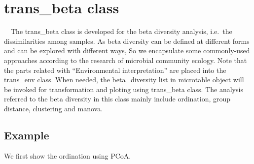 \documentclass[
]{book}
\newenvironment{Shaded}{\begin{snugshade}}{\end{snugshade}}
\newcommand{\AttributeTok}[1]{\textcolor[rgb]{0.77,0.63,0.00}{#1}}
\newcommand{\CommentTok}[1]{\textcolor[rgb]{0.56,0.35,0.01}{\textit{#1}}}
\newcommand{\ConstantTok}[1]{\textcolor[rgb]{0.00,0.00,0.00}{#1}}
\newcommand{\FunctionTok}[1]{\textcolor[rgb]{0.00,0.00,0.00}{#1}}
\newcommand{\NormalTok}[1]{#1}
\newcommand{\OtherTok}[1]{\textcolor[rgb]{0.56,0.35,0.01}{#1}}
\newcommand{\SpecialCharTok}[1]{\textcolor[rgb]{0.00,0.00,0.00}{#1}}
\newcommand{\StringTok}[1]{\textcolor[rgb]{0.31,0.60,0.02}{#1}}
\begin{document}
\hypertarget{trans_beta-class}{%
\section{trans\_beta class}\label{trans_beta-class}}

　The trans\_beta class is developed for the beta diversity analysis, i.e.~the dissimilarities among samples.
As beta diversity can be defined at different forms\citep{Tuomisto_diversity_2010} and can be explored with different ways\citep{Anderson_Navigating_2011},
So we encapsulate some commonly-used approaches according to the research of microbial community ecology\citep{Ramette_Multivariate_2007}.
Note that the parts related with ``Environmental interpretation'' are placed into the trans\_env class.
When needed, the beta\_diversity list in microtable object will be invoked for transformation and ploting using trans\_beta class.
The analysis referred to the beta diversity in this class mainly include ordination, group distance, clustering and manova.

\hypertarget{example-4}{%
\subsection{Example}\label{example-4}}

We first show the ordination using PCoA.

\begin{Shaded}
\end{Shaded}

\begin{Shaded}
\end{Shaded}
\end{document}
